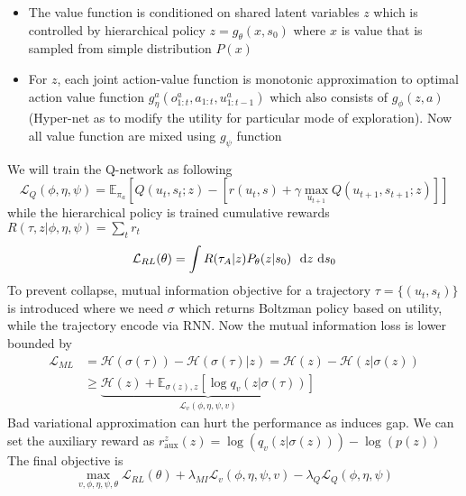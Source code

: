 \begin{itemize}
    \item The value function is conditioned on shared latent variables $z$ which is controlled by hierarchical policy $z = g_\theta(x, s_0)$ where $x$ is value that is sampled from simple distribution $P(x)$
    \item For $z$, each joint action-value function is monotonic approximation to optimal action value function $g_{\eta}^a(o^a_{1:t}, a_{1:t}, u^{a}_{1:t-1})$ which also consists of $g_{\phi}(z, a)$ (Hyper-net as to modify the utility for particular mode of exploration). Now all value function are mixed using $g_{\psi}$ function 
\end{itemize}
We will train the Q-network as following 
\begin{equation}
    \mathcal{L}_{Q}(\phi, \eta,\psi) = \mathbb{E}_{\pi_a}  \left[ Q(u_t, s_t ; z) - \left[r(u_t, s) + \gamma \max_{u_{t+1}} Q(u_{t+1}, s_{t+1} ; z)\right] \right]
\end{equation}
while the hierarchical policy is trained cumulative rewards $R(\tau, z | \phi, \eta, \psi)= \sum_t r_t$ 
\begin{equation}
    \mathcal{L}_{RL}(\theta) = \int R(\tau_A | z)P_{\theta}(z | s_0) \ \ \mathrm{d} z\ \mathrm{d} s_0
\end{equation}
To prevent collapse, mutual information objective for a trajectory $\tau = \{(u_t, s_t)\}$ is introduced where we need $\sigma$ which returns Boltzman policy based on utility, while the trajectory encode via RNN. Now the mutual information loss is lower bounded by
\begin{equation}
\begin{aligned}
    \mathcal{L}_{ML} &= \mathcal{H}(\sigma(\tau)) - \mathcal{H}(\sigma(\tau) | z) = \mathcal{H}(z) - \mathcal{H}(z | \sigma(z)) \\
    &\ge \underbrace{\mathcal{H}(z) + \mathbb{E}_{\sigma(z), z} \left[ \log q_v(z | \sigma(\tau)) \right]}_{\mathcal{L}_v(\phi, \eta, \psi, v)}
\end{aligned}
\end{equation}
Bad variational approximation can hurt the performance as induces gap. We can set the auxiliary reward as $r^z_{\text{aux}} (z) = \log(q_v(z | \sigma(z))) - \log  (p(z))$
The final objective is 
\begin{equation}
    \max_{v, \phi, \eta, \psi, \theta} \mathcal{L}_{RL}(\theta) + \lambda_{MI}\mathcal{L}_v(\phi, \eta, \psi, v) - \lambda_{Q}\mathcal{L}_{Q}(\phi, \eta,\psi)
\end{equation}